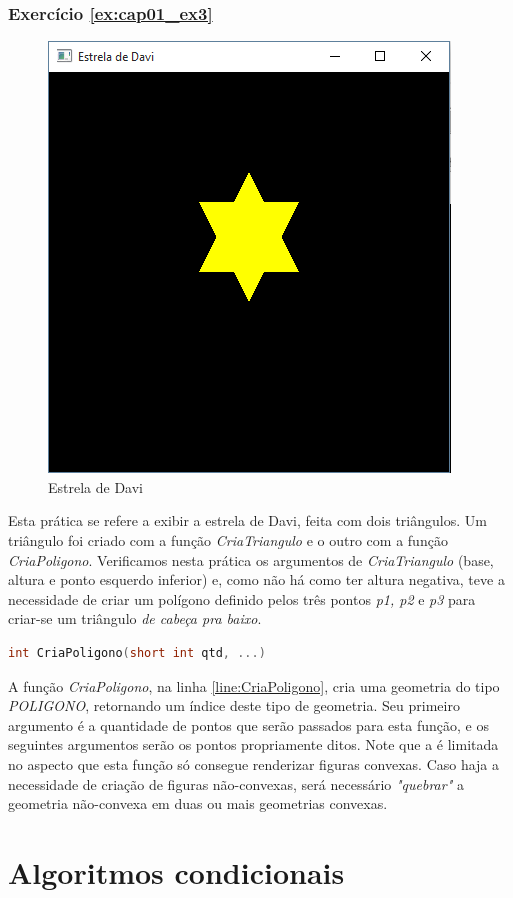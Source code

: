 \subsection*{Exercício \ref{ex:cap01_ex3}}
\begin{figure}[ht]
  \centerline{\includegraphics[width=.5\textwidth]{img/cap1_ex2.png}}
  \caption{Estrela de Davi}
  \label{fig:cap01_ex3}
\end{figure}
Esta prática se refere a exibir a estrela de Davi, feita com dois triângulos. Um triângulo foi criado com a função \emph{CriaTriangulo} e o outro com a função \emph{CriaPoligono}. Verificamos nesta prática os argumentos de \emph{CriaTriangulo} (base, altura e ponto esquerdo inferior) e, como não há como ter altura negativa, teve a necessidade de criar um polígono definido pelos três pontos \emph{p1, p2} e \emph{p3} para criar-se um triângulo \emph{de cabeça pra baixo}.


\begin{lstlisting}[label={func:CriaPoligono},language=C++]
int CriaPoligono(short int qtd, ...)
\end{lstlisting}
A função \emph{CriaPoligono}, na linha \ref{line:CriaPoligono}, cria uma geometria do tipo \emph{POLIGONO}, retornando um índice deste tipo de geometria. Seu primeiro argumento é a quantidade de pontos que serão passados para esta função, e os seguintes argumentos serão os pontos propriamente ditos. Note que a \playAPC{} é limitada no aspecto que esta função só consegue renderizar figuras convexas. Caso haja a necessidade de criação de figuras não-convexas, será necessário \emph{"quebrar"} a geometria não-convexa em duas ou mais geometrias convexas.


\chapter[Algoritmos condicionais]
{Algoritmos condicionais}



